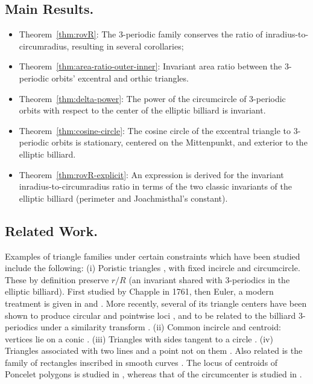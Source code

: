 \subsection{Main Results.}

\begin{itemize}
    \item Theorem~\ref{thm:rovR}: The 3-periodic family conserves the ratio of inradius-to-circumradius, resulting in several corollaries;
    \item Theorem~\ref{thm:area-ratio-outer-inner}: Invariant area ratio between the 3-periodic orbits' excentral and orthic triangles.
    \item Theorem~\ref{thm:delta-power}: The power of the circumcircle of 3-periodic orbits with respect to the center of the elliptic billiard is invariant.
    \item Theorem~\ref{thm:cosine-circle}: 
    The cosine circle of the excentral triangle to 3-periodic orbits is stationary, centered on the Mittenpunkt, and exterior to the elliptic billiard.
    \item Theorem~\ref{thm:rovR-explicit}: An expression is derived for the invariant inradius-to-circumradius ratio in terms of the two classic invariants of the elliptic billiard (perimeter and Joachmisthal's constant).
\end{itemize}

\bigskip
\subsection{Related Work.}
Examples of triangle families under certain constraints which have been studied include the following: (i) Poristic triangles \cite{Gallatly1913}, with fixed incircle and circumcircle. These by definition   preserve  $r/R$ (an invariant shared with 3-periodics in the elliptic billiard). First studied by Chapple in 1761, then Euler, a modern treatment is given in \cite{Weaver1924,Weaver1933} and \cite{Murnaghan1925}. More recently, several of its triangle centers have been shown to produce circular and pointwise loci \cite{Odenhal2011}, and to be related to the billiard 3-periodics under a similarity transform \cite{garcia2020-poristics}. (ii) Common incircle and centroid: vertices lie on a conic \cite{Pamfilos2011}. (iii)
Triangles with sides tangent to a circle \cite{Nikolina-families2012}. (iv) Triangles associated with two lines and a point not on them \cite{Sliepcevic2013}. Also related is the family of rectangles inscribed in smooth curves \cite{schwartz2018-rectangles}. The locus of centroids of Poncelet polygons is studied in \cite{schwartz2016-com}, whereas that of the circumcenter is studied in \cite{ana2020}.

